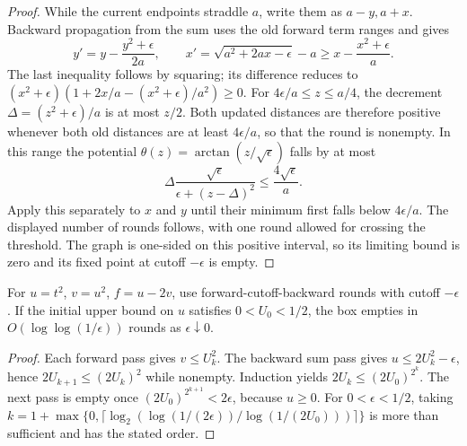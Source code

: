 \begin{proof}
While the current endpoints straddle $a$, write them as $a-y,a+x$.
Backward propagation from the sum uses the old forward term ranges and
gives
\[
 y'=y-\frac{y^2+\epsilon}{2a},\qquad
 x'=\sqrt{a^2+2ax-\epsilon}-a
                  \ge x-\frac{x^2+\epsilon}{a}.
\]
The last inequality follows by squaring; its difference reduces to
$(x^2+\epsilon)(1+2x/a-(x^2+\epsilon)/a^2)\ge0$.
For $4\epsilon/a\le z\le a/4$, the decrement
$\Delta=(z^2+\epsilon)/a$ is at most $z/2$.
Both updated distances are therefore positive whenever both old distances
are at least $4\epsilon/a$, so that the round is nonempty. In this range
the potential $\theta(z)=\arctan(z/\sqrt\epsilon)$ falls by at most
\[
 \Delta\frac{\sqrt\epsilon}{\epsilon+(z-\Delta)^2}
 \le\frac{4\sqrt\epsilon}{a}.
\]
Apply this separately to $x$ and $y$ until their minimum first falls below
$4\epsilon/a$. The displayed number of rounds follows, with one round
allowed for crossing the threshold. The graph is one-sided on this
positive interval, so its limiting bound is zero and its fixed point
at cutoff $-\epsilon$ is empty.
\end{proof}

\begin{proposition}
\label{prop:fast-rounds}
For $u=t^2$, $v=u^2$, $f=u-2v$, use forward-cutoff-backward rounds with
cutoff $-\epsilon$. If the initial upper bound on $u$ satisfies $0<U_0<1/2$,
the box empties in $O(\log\log(1/\epsilon))$ rounds as
$\epsilon\downarrow0$.
\end{proposition}

\begin{proof}
Each forward pass gives $v\le U_k^2$. The backward sum pass gives
$u\le2U_k^2-\epsilon$, hence $2U_{k+1}\le(2U_k)^2$ while nonempty.
Induction yields $2U_k\le(2U_0)^{2^k}$. The next pass is empty once
$(2U_0)^{2^{k+1}}<2\epsilon$, because $u\ge0$.
For $0<\epsilon<1/2$, taking
$k=1+\max\{0,\lceil\log_2(\log(1/(2\epsilon)) /
\log(1/(2U_0)))\rceil\}$ is more than sufficient and has the stated order.
\end{proof}
